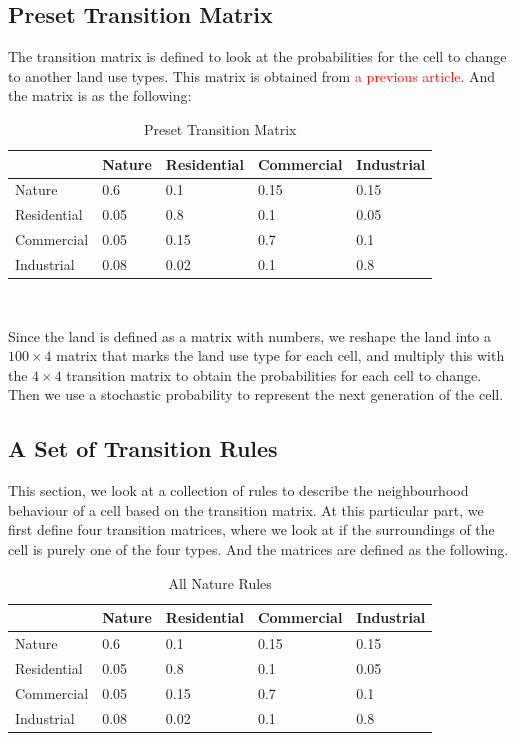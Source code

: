 \documentclass[a4paper,12pt]{report}
\begin{document}
\subsection{Preset Transition Matrix}

The transition matrix is defined to look at the probabilities for the cell to change to another land use types. This matrix is obtained from \textcolor{red}{a previous article}. And the matrix is as the following:
\begin{table}[ht]
\centering
\begin{tabular}{l|l|l|l|l}
            & Nature & Residential & Commercial & Industrial \\ \hline
Nature      & 0.6    & 0.1         & 0.15       & 0.15       \\ \hline
Residential & 0.05   & 0.8         & 0.1        & 0.05       \\ \hline
Commercial  & 0.05   & 0.15        & 0.7        & 0.1        \\ \hline
Industrial  & 0.08   & 0.02        & 0.1        & 0.8       
\end{tabular}
\\[10pt]
\caption{Preset Transition Matrix}
\end{table}

\pagebreak

Since the land is defined as a matrix with numbers, we reshape the land into a $100\times 4$ matrix that marks the land use type for each cell, and multiply this with the $4\times 4$ transition matrix to obtain the probabilities for each cell to change. Then we use a stochastic probability to represent the next generation of the cell.  

\subsection{A Set of Transition Rules}

This section, we look at a collection of rules to describe the neighbourhood behaviour of a cell based on the transition matrix. At this particular part, we first define four transition matrices, where we look at if the surroundings of the cell is purely one of the four types. And the matrices are defined as the following. 

\begin{table}[ht]
\centering
\begin{tabular}{l|l|l|l|l}
            & Nature & Residential & Commercial & Industrial \\ \hline
Nature      & 0.6    & 0.1         & 0.15       & 0.15       \\ \hline
Residential & 0.05   & 0.8         & 0.1        & 0.05       \\ \hline
Commercial  & 0.05   & 0.15        & 0.7        & 0.1        \\ \hline
Industrial  & 0.08   & 0.02        & 0.1        & 0.8       
\end{tabular}
\\[10pt]
\caption{All Nature Rules}
\end{table}
\end{document}
